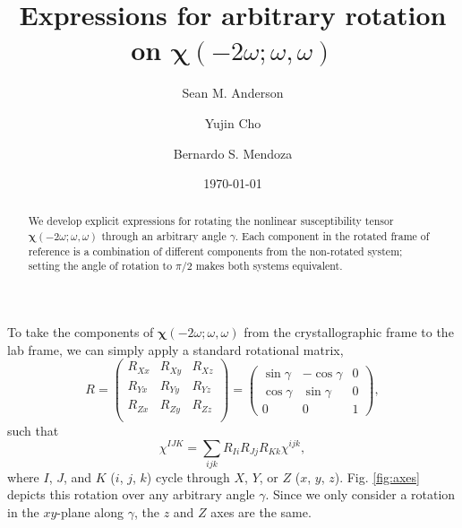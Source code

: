 \documentclass[aps,prb,10pt,letterpaper,notitlepage]{revtex4-1}
\begin{document}
\title{Expressions for arbitrary rotation on
\texorpdfstring{$\boldsymbol{\chi}(-2\omega;\omega,\omega)$}{X(2w)}}
\author{Sean M. Anderson}
\author{Yujin Cho}
\author{Bernardo S. Mendoza}
\date{\today}

\begin{abstract}
We develop explicit expressions for rotating the nonlinear susceptibility tensor
$\boldsymbol{\chi}(-2\omega;\omega,\omega)$ through an arbitrary angle $\gamma$.
Each component in the rotated frame of reference is a combination of different
components from the non-rotated system; setting the angle of rotation to $\pi/2$
makes both systems equivalent.
\end{abstract}

\maketitle

To take the components of $\boldsymbol{\chi}(-2\omega;\omega,\omega)$ from the
crystallographic frame to the lab frame, we can simply apply a standard
rotational matrix,
\begin{equation*}
R =
\begin{pmatrix}
R_{Xx} & R_{Xy} & R_{Xz} \\
R_{Yx} & R_{Yy} & R_{Yz} \\
R_{Zx} & R_{Zy} & R_{Zz} \\
\end{pmatrix}
=
\begin{pmatrix}
\sin\gamma & -\cos\gamma & 0 \\
\cos\gamma &  \sin\gamma & 0 \\
    0    &      0    & 1
\end{pmatrix},
\end{equation*}
such that
\begin{equation*}
\chi^{IJK} = \sum_{ijk}R_{Ii}R_{Jj}R_{Kk}\chi^{ijk},
\end{equation*}
where $I$, $J$, and $K$ ($i$, $j$, $k$) cycle through $X$, $Y$, or $Z$ ($x$,
$y$, $z$). Fig. \ref{fig:axes} depicts this rotation over any arbitrary angle
$\gamma$. Since we only consider a rotation in the $xy$-plane along $\gamma$,
the $z$ and $Z$ axes are the same.
\end{document}
